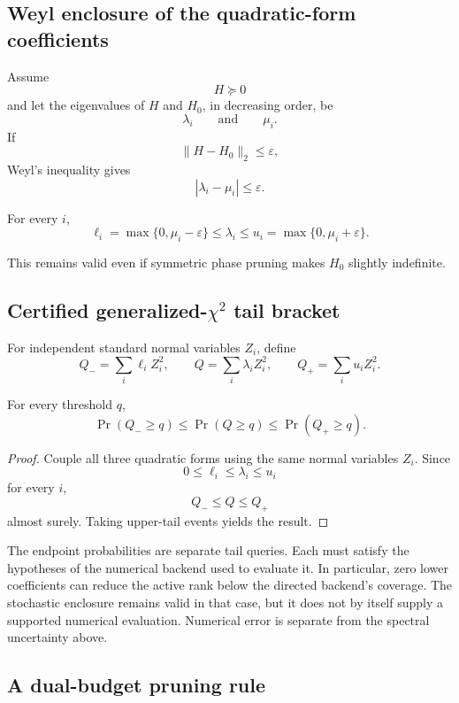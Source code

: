 \subsection{Weyl enclosure of the quadratic-form coefficients}

Assume
\[
H\succeq0
\]
and let the eigenvalues of \(H\) and \(H_0\), in decreasing order, be
\[
\lambda_i
\qquad\text{and}\qquad
\mu_i.
\]
If
\[
\|H-H_0\|_2\le\varepsilon,
\]
Weyl's inequality gives
\[
|\lambda_i-\mu_i|\le\varepsilon.
\]

\begin{corollary}\label{claim:final-22-2}
For every \(i\),
\[
\boxed{
\ell_i
=
\max\{0,\mu_i-\varepsilon\}
\le
\lambda_i
\le
u_i
=
\max\{0,\mu_i+\varepsilon\}.
}
\]
\end{corollary}

This remains valid even if symmetric phase pruning makes \(H_0\) slightly
indefinite.

\subsection{Certified generalized-\texorpdfstring{\(\chi^2\)}{chi-square} tail bracket}

For independent standard normal variables \(Z_i\), define
\[
Q_-=\sum_i\ell_iZ_i^2,
\qquad
Q=\sum_i\lambda_iZ_i^2,
\qquad
Q_+=\sum_i u_iZ_i^2.
\]

\begin{theorem}\label{claim:final-22-3}
For every threshold \(q\),
\[
\boxed{
\Pr(Q_-\ge q)
\le
\Pr(Q\ge q)
\le
\Pr(Q_+\ge q).
}
\]
\end{theorem}

\begin{proof}
Couple all three quadratic forms using the same normal variables \(Z_i\).
Since
\[
0\le\ell_i\le\lambda_i\le u_i
\]
for every \(i\),
\[
Q_-\le Q\le Q_+
\]
almost surely.  Taking upper-tail events yields the result.
\end{proof}

The endpoint probabilities are separate tail queries. Each must satisfy the
hypotheses of the numerical backend used to evaluate it. In particular, zero
lower coefficients can reduce the active rank below the directed backend's
coverage. The stochastic enclosure remains valid in that case, but it does
not by itself supply a supported numerical evaluation. Numerical error is
separate from the spectral uncertainty above.

\subsection{A dual-budget pruning rule}

